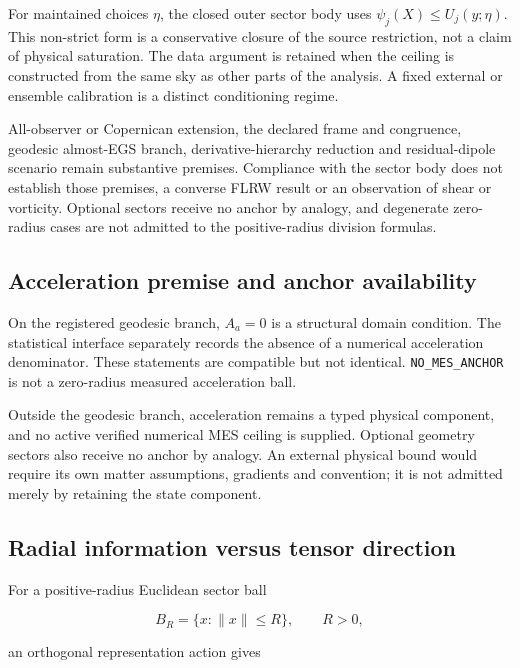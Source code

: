 \documentclass[
  11pt,
  a4paper]{article}
\begin{document}
For maintained choices \(\eta\), the closed outer sector body uses
\(\psi_j(X)\le U_j(y;\eta)\). This non-strict form is a conservative
closure of the source restriction, not a claim of physical saturation.
The data argument is retained when the ceiling is constructed from the same
sky as other parts of the analysis. A fixed external or ensemble calibration
is a distinct conditioning regime.

All-observer or Copernican extension, the declared frame and congruence,
geodesic almost-EGS branch, derivative-hierarchy reduction and residual-dipole
scenario remain substantive premises. Compliance with the sector body does not
establish those premises, a converse FLRW result or an observation of shear or
vorticity. Optional sectors receive no anchor by analogy, and degenerate
zero-radius cases are not admitted to the positive-radius division formulas.

\hypertarget{acceleration-premise-and-anchor-availability}{%
\subsection{Acceleration premise and anchor availability}\label{acceleration-premise-and-anchor-availability}}

On the registered geodesic branch, \(A_a=0\) is a structural domain condition. The statistical interface separately records the absence of a numerical acceleration denominator. These statements are compatible but not identical. \texttt{NO\_MES\_ANCHOR} is not a zero-radius measured acceleration ball.

Outside the geodesic branch, acceleration remains a typed physical component, and no active verified numerical MES ceiling is supplied. Optional geometry sectors also receive no anchor by analogy. An external physical bound would require its own matter assumptions, gradients and convention; it is not admitted merely by retaining the state component.

\hypertarget{radial-information-versus-tensor-direction}{%
\subsection{Radial information versus tensor direction}\label{radial-information-versus-tensor-direction}}

For a positive-radius Euclidean sector ball

\[
B_R=\{x:\|x\|\le R\},\qquad R>0,
\]

an orthogonal representation action gives
\end{document}
